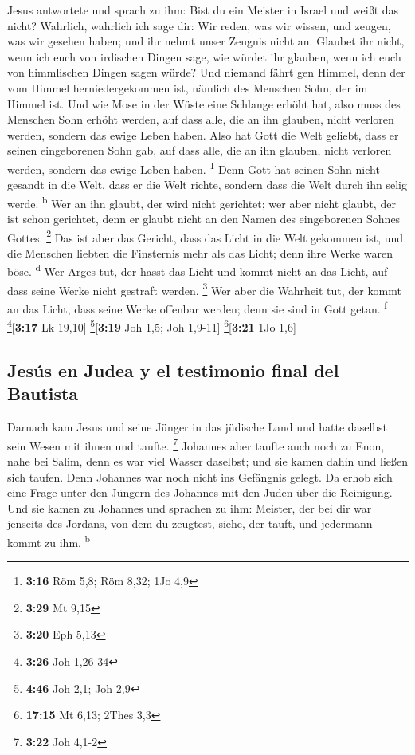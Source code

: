  Jesus antwortete und sprach zu ihm: Bist du ein Meister
in Israel und weißt das nicht?  Wahrlich, wahrlich ich
sage dir: Wir reden, was wir wissen, und zeugen, was wir gesehen haben;
und ihr nehmt unser Zeugnis nicht an.  Glaubet ihr nicht,
wenn ich euch von irdischen Dingen sage, wie würdet ihr glauben, wenn
ich euch von himmlischen Dingen sagen würde?  Und niemand
fährt gen Himmel, denn der vom Himmel herniedergekommen ist, nämlich des
Menschen Sohn, der im Himmel ist.  Und wie Mose in der
Wüste eine Schlange erhöht hat, also muss des Menschen Sohn erhöht
werden,  auf dass alle, die an ihn glauben, nicht
verloren werden, sondern das ewige Leben haben.  Also hat
Gott die Welt geliebt, dass er seinen eingeborenen Sohn gab, auf dass
alle, die an ihn glauben, nicht verloren werden, sondern das ewige Leben
haben. \footnote{\textbf{3:16} Röm 5,8; Röm 8,32; 1Jo 4,9}
 Denn Gott hat seinen Sohn nicht gesandt in die Welt,
dass er die Welt richte, sondern dass die Welt durch ihn selig werde.
\textsuperscript{b}  Wer an ihn glaubt, der wird nicht
gerichtet; wer aber nicht glaubt, der ist schon gerichtet, denn er
glaubt nicht an den Namen des eingeborenen Sohnes Gottes. \footnote{\textbf{3:29}
  Mt 9,15}  Das ist aber das Gericht, dass das Licht in
die Welt gekommen ist, und die Menschen liebten die Finsternis mehr als
das Licht; denn ihre Werke waren böse. \textsuperscript{d}
 Wer Arges tut, der hasst das Licht und kommt nicht an
das Licht, auf dass seine Werke nicht gestraft werden. \footnote{\textbf{3:20}
  Eph 5,13}  Wer aber die Wahrheit tut, der kommt an das
Licht, dass seine Werke offenbar werden; denn sie sind in Gott getan.
\textsuperscript{f} \footnote{\textbf{3:26} Joh 1,26-34}{[}\textbf{3:17}
Lk 19,10{]} \footnote{\textbf{4:46} Joh 2,1; Joh 2,9}{[}\textbf{3:19}
Joh 1,5; Joh 1,9-11{]} \footnote{\textbf{17:15} Mt 6,13; 2Thes 3,3}{[}\textbf{3:21}
1Jo 1,6{]}

\hypertarget{jesuxfas-en-judea-y-el-testimonio-final-del-bautista}{%
\subsection{Jesús en Judea y el testimonio final del
Bautista}\label{jesuxfas-en-judea-y-el-testimonio-final-del-bautista}}

 Darnach kam Jesus und seine Jünger in das jüdische Land
und hatte daselbst sein Wesen mit ihnen und taufte. \footnote{\textbf{3:22}
  Joh 4,1-2}  Johannes aber taufte auch noch zu Enon,
nahe bei Salim, denn es war viel Wasser daselbst; und sie kamen dahin
und ließen sich taufen.  Denn Johannes war noch nicht ins
Gefängnis gelegt.  Da erhob sich eine Frage unter den
Jüngern des Johannes mit den Juden über die Reinigung. 
Und sie kamen zu Johannes und sprachen zu ihm: Meister, der bei dir war
jenseits des Jordans, von dem du zeugtest, siehe, der tauft, und
jedermann kommt zu ihm. \textsuperscript{b}

